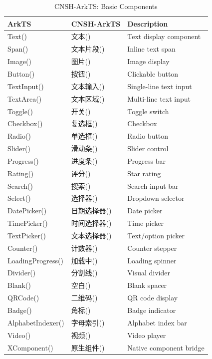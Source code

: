 \begin{table}[h]
\centering
\caption{CNSH-ArkTS: Basic Components}
\renewcommand{\arraystretch}{1.3}
\begin{tabular}{llp{5cm}}
\toprule
\textbf{ArkTS} & \textbf{CNSH-ArkTS} & \textbf{Description} \\
\midrule
Text() & 文本() & Text display component \\
Span() & 文本片段() & Inline text span \\
Image() & 图片() & Image display \\
Button() & 按钮() & Clickable button \\
TextInput() & 文本输入() & Single-line text input \\
TextArea() & 文本区域() & Multi-line text input \\
Toggle() & 开关() & Toggle switch \\
Checkbox() & 复选框() & Checkbox \\
Radio() & 单选框() & Radio button \\
Slider() & 滑动条() & Slider control \\
Progress() & 进度条() & Progress bar \\
Rating() & 评分() & Star rating \\
Search() & 搜索() & Search input bar \\
Select() & 选择器() & Dropdown selector \\
DatePicker() & 日期选择器() & Date picker \\
TimePicker() & 时间选择器() & Time picker \\
TextPicker() & 文本选择器() & Text/option picker \\
Counter() & 计数器() & Counter stepper \\
LoadingProgress() & 加载中() & Loading spinner \\
Divider() & 分割线() & Visual divider \\
Blank() & 空白() & Blank spacer \\
QRCode() & 二维码() & QR code display \\
Badge() & 角标() & Badge indicator \\
AlphabetIndexer() & 字母索引() & Alphabet index bar \\
Video() & 视频() & Video player \\
XComponent() & 原生组件() & Native component bridge \\
\bottomrule
\end{tabular}
\end{table}

